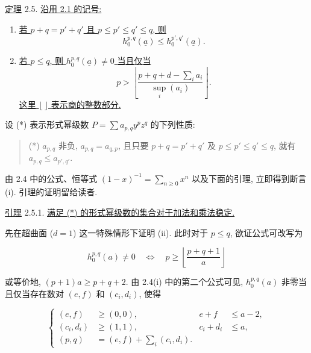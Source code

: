 \underline{定理} 2.5. \underline{沿用 2.1 的记号:}

\begin{enumerate}[label=(\roman*),leftmargin=2.6em]
\item \underline{若 $p+q=p'+q'$ 且 $p\leq p'\leq q'\leq q$, 则}
\begin{equation*}
h_0^{p,q}(\underline a)\leq h_0^{p',q'}(\underline a).
\end{equation*}

\item \underline{若 $p\leq q$, 则 $h_0^{p,q}(\underline a)\ne0$ 当且仅当}
\begin{equation*}
p>\left\lfloor
\frac{p+q+d-\sum_i a_i}{\sup_i(a_i)}
\right\rfloor.
\end{equation*}
\underline{这里 $\lfloor\ \rfloor$ 表示商的整数部分.}
\end{enumerate}


设 (*) 表示形式幂级数 $P=\sum a_{p,q}y^pz^q$ 的下列性质:

\begin{quote}
(*) $a_{p,q}$ 非负, $a_{p,q}=a_{q,p}$, 且只要 $p+q=p'+q'$ 及 $p\leq p'\leq q'\leq q$, 就有 $a_{p,q}\leq a_{p',q'}$.
\end{quote}

由 2.4 中的公式、恒等式 $(1-x)^{-1}=\sum_{n\geq0}x^n$ 以及下面的引理, 立即得到断言 (i). 引理的证明留给读者.

\underline{引理} 2.5.1. \underline{满足 (*) 的形式幂级数的集合对于加法和乘法稳定.}

先在超曲面 ($d=1$) 这一特殊情形下证明 (ii). 此时对于 $p\leq q$, 欲证公式可改写为

\begin{equation}\tag{2.5.2}
h_0^{p,q}(a)\ne0
\quad\Longleftrightarrow\quad
p\geq\left\lfloor\frac{p+q+1}{a}\right\rfloor
\end{equation}

或等价地, $(p+1)a\geq p+q+2$. 由 2.4(i) 中的第二个公式可见, $h_0^{p,q}(a)$ 非零当且仅当存在数对 $(e,f)$ 和 $(c_i,d_i)$, 使得

\begin{equation}\tag{2.5.3}
\left\{
\begin{aligned}
(e,f)&\geq(0,0),& e+f&\leq a-2,\\
(c_i,d_i)&\geq(1,1),& c_i+d_i&\leq a,\\
(p,q)&=(e,f)+\sum_i(c_i,d_i).&&
\end{aligned}
\right.
\end{equation}

